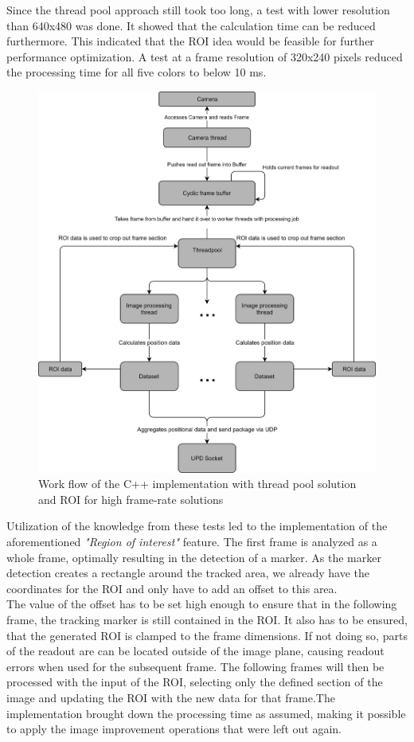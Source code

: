 Since the thread pool approach still took too long, a test with lower resolution than 640x480 was done. It showed that the calculation time can be reduced furthermore. This indicated that the ROI idea would be feasible for further performance optimization. A test at a frame resolution of 320x240 pixels reduced the processing time for all five colors to below 10 ms.
\begin{figure}[H]
\centering
\includegraphics[width=\textwidth]{images/pi_workflow_500.jpg}
\caption{Work flow of the C++ implementation with thread pool solution and ROI for high frame-rate solutions}
\label{c++ work flow map} 
\end{figure}
Utilization of the knowledge from these tests led to the implementation of the aforementioned\textit{ "Region of interest"} feature.
The first frame is analyzed as a whole frame, optimally resulting in the detection of a marker. As the marker detection creates a rectangle around the tracked area, we already have the coordinates for the ROI and only have to add an offset to this area.
\\The value of the offset has to be set high enough to ensure that in the following frame, the tracking marker is still contained in the ROI. It also has to be ensured, that the generated ROI is clamped to the frame dimensions. If not doing so, parts of the readout are can be located outside of the image plane, causing readout errors when used for the subsequent frame. The following frames will then be processed with the input of the ROI, selecting only the defined section of the image and updating the ROI with the new data for that frame.The implementation brought down the processing time as assumed, making it possible to apply the image improvement operations that were left out again.
